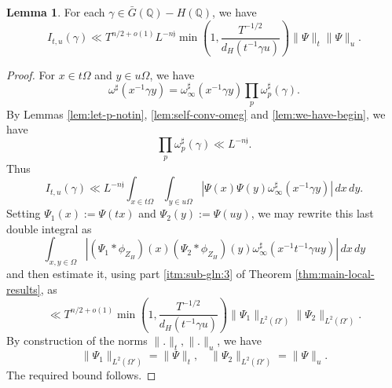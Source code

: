 \documentclass[reqno]{amsart}
\theoremstyle{plain} \newtheorem{theorem} {Theorem}
\theoremstyle{definition} \newtheorem{definition} [theorem] {Definition}
\theoremstyle{itplain} %
\newtheorem{lemma}[theorem]{Lemma}
\numberwithin{equation}{section}
\numberwithin{theorem}{section}
\begin{document}
\begin{lemma}\label{lem:sub-gln:each-gamma-in}
  For each $\gamma \in \bar{G}(\mathbb{Q}) - H(\mathbb{Q})$, we have
  \begin{equation*}
    I_{t, u}(\gamma) \ll T^{n/2 + o(1)} L^{-n \mathfrak{j}}
    \min \left( 1, \frac{T^{-1/2}}{d_H(t^{-1} \gamma u)} \right)
    \|\Psi \|_t \|\Psi \|_{u}.
  \end{equation*}
\end{lemma}
\begin{proof}
  For $x \in t \Omega$ and $y \in u \Omega$, we have
  \begin{equation*}
    \omega^\sharp (x ^{-1} \gamma y)
    =
    \omega_\infty^\sharp (x ^{-1} \gamma y)
    \prod_p \omega_p ^\sharp (\gamma).
  \end{equation*}
  By Lemmas \ref{lem:let-p-notin}, \ref{lem:self-conv-omeg} and \ref{lem:we-have-begin}, we have
  \begin{equation*}
    \prod_p \omega_p ^\sharp (\gamma) \ll L^{-n \mathfrak{j}}.
  \end{equation*}
  Thus
  \begin{equation*}
    I_{t, u}(\gamma) \ll L^{-n \mathfrak{j}} \int _{x \in t \Omega } \int _{y \in u \Omega } \left\lvert \Psi(x) \Psi(y)
      \omega_{\infty}^{\sharp}(x ^{-1} \gamma y) \right\rvert \,d x \,d y.
  \end{equation*}
  Setting $\Psi_1(x) := \Psi(t x)$ and $\Psi_2(y) := \Psi(u y)$, we may rewrite this last double integral as
  \begin{equation*}
    \int _{x ,y \in \Omega } \left\lvert (\Psi_1 \ast \phi_{Z_H})(x) (\Psi_2 \ast \phi_{Z_H})(y) \omega_\infty^\sharp(x^{-1} t^{-1} \gamma u y) \right\rvert \,d x \,d y
  \end{equation*}
  and then estimate it, using part \eqref{itm:sub-gln:3} of Theorem \ref{thm:main-local-results}, as
  \begin{equation*}
    \ll
    T^{n/2 + o(1)}
    \min \left( 1, \frac{T^{-1/2}}{d_H(t^{-1} \gamma u)} \right)
    \|\Psi_1\|_{L^2(\Omega')}
    \|\Psi_2\|_{L^2(\Omega')}.
  \end{equation*}
  By construction of the norms $\|.\|_t, \|.\|_{u}$, we have
  \begin{equation*}
    \|\Psi_1\|_{L^2(\Omega ')} = \|\Psi\|_t, \quad
    \|\Psi_2\|_{L^2(\Omega ')} = \|\Psi\|_{u}.
  \end{equation*}
  The required bound follows.
\end{proof}
\end{document}
